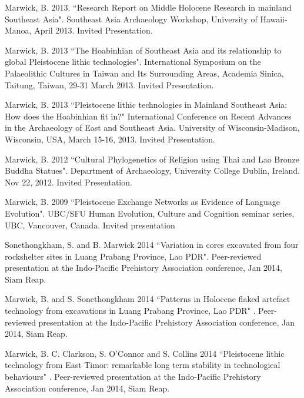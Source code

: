 \documentclass[11pt,article,oneside]{memoir}
\begin{document}
\ind Marwick, B. 2013. ``Research Report on Middle Holocene Research in mainland Southeast Asia". Southeast Asia Archaeology Workshop, University of Hawaii-Manoa, April 2013. Invited Presentation.

\ind Marwick, B. 2013 ``The Hoabinhian of Southeast Asia and its relationship to global Pleistocene lithic technologies". International Symposium on the Palaeolithic Cultures in Taiwan and Its Surrounding Areas, Academia Sinica, Taitung, Taiwan, 29-31 March 2013.  Invited Presentation.

\ind Marwick, B. 2013 ``Pleistocene lithic technologies in Mainland Southeast Asia: How does the Hoabinhian fit in?"  International Conference on Recent Advances in the Archaeology of East and Southeast Asia. University of Wisconsin-Madison, Wisconsin, USA, March 15-16, 2013. Invited Presentation.

\ind Marwick, B. 2012 ``Cultural Phylogenetics of Religion using Thai and Lao Bronze Buddha Statues". Department of Archaeology, University College Dublin, Ireland. Nov 22, 2012. Invited Presentation.

\ind Marwick, B. 2009 ``Pleistocene Exchange Networks as Evidence of Language Evolution".  UBC/SFU Human Evolution, Culture and Cognition seminar series, UBC, Vancouver, Canada. Invited presentation

\bigskip



\medskip

\ind Sonethongkham, S. and B. Marwick 2014 ``Variation in cores excavated from four rockshelter sites in Luang Prabang Province, Lao PDR". Peer-reviewed presentation at the Indo-Pacific Prehistory Association conference, Jan 2014, Siam Reap.

\ind Marwick, B.  and S. Sonethongkham 2014 ``Patterns in Holocene flaked artefact technology from excavations in Luang Prabang Province, Lao PDR" . Peer-reviewed presentation at the Indo-Pacific Prehistory Association conference, Jan 2014, Siam Reap.

\ind Marwick, B. C. Clarkson, S. O’Connor and S. Collins 2014 ``Pleistocene lithic technology from East Timor: remarkable long term stability in technological behaviours" . Peer-reviewed presentation at the Indo-Pacific Prehistory Association conference, Jan 2014, Siam Reap.
\end{document}
